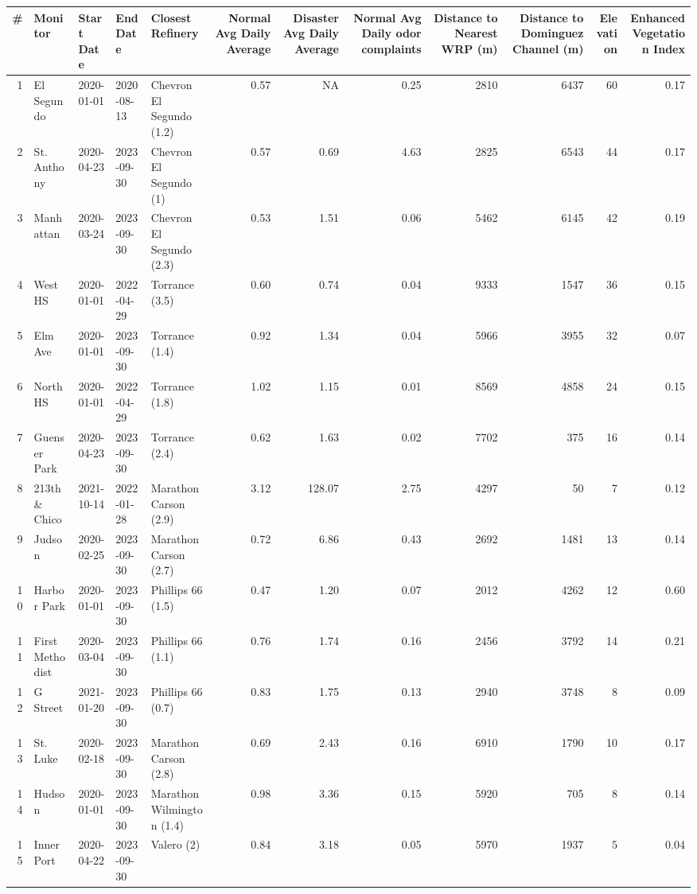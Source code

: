 
\begin{tabular}{r|l|l|l|l|r|r|r|r|r|r|r}
\hline
\# & Monitor & Start Date & End Date & Closest Refinery & Normal Avg Daily Average & Disaster Avg Daily Average & Normal Avg Daily odor complaints & Distance to Nearest WRP (m) & Distance to Dominguez Channel (m) & Elevation & Enhanced Vegetation Index\\
\hline
1 & El Segundo & 2020-01-01 & 2020-08-13 & Chevron El Segundo (1.2) & 0.57 & NA & 0.25 & 2810 & 6437 & 60 & 0.17\\
\hline
2 & St. Anthony & 2020-04-23 & 2023-09-30 & Chevron El Segundo (1) & 0.57 & 0.69 & 4.63 & 2825 & 6543 & 44 & 0.17\\
\hline
3 & Manhattan & 2020-03-24 & 2023-09-30 & Chevron El Segundo (2.3) & 0.53 & 1.51 & 0.06 & 5462 & 6145 & 42 & 0.19\\
\hline
4 & West HS & 2020-01-01 & 2022-04-29 & Torrance (3.5) & 0.60 & 0.74 & 0.04 & 9333 & 1547 & 36 & 0.15\\
\hline
5 & Elm Ave & 2020-01-01 & 2023-09-30 & Torrance (1.4) & 0.92 & 1.34 & 0.04 & 5966 & 3955 & 32 & 0.07\\
\hline
6 & North HS & 2020-01-01 & 2022-04-29 & Torrance (1.8) & 1.02 & 1.15 & 0.01 & 8569 & 4858 & 24 & 0.15\\
\hline
7 & Guenser Park & 2020-04-23 & 2023-09-30 & Torrance (2.4) & 0.62 & 1.63 & 0.02 & 7702 & 375 & 16 & 0.14\\
\hline
8 & 213th \& Chico & 2021-10-14 & 2022-01-28 & Marathon Carson (2.9) & 3.12 & 128.07 & 2.75 & 4297 & 50 & 7 & 0.12\\
\hline
9 & Judson & 2020-02-25 & 2023-09-30 & Marathon Carson (2.7) & 0.72 & 6.86 & 0.43 & 2692 & 1481 & 13 & 0.14\\
\hline
10 & Harbor Park & 2020-01-01 & 2023-09-30 & Phillips 66 (1.5) & 0.47 & 1.20 & 0.07 & 2012 & 4262 & 12 & 0.60\\
\hline
11 & First Methodist & 2020-03-04 & 2023-09-30 & Phillips 66 (1.1) & 0.76 & 1.74 & 0.16 & 2456 & 3792 & 14 & 0.21\\
\hline
12 & G Street & 2021-01-20 & 2023-09-30 & Phillips 66 (0.7) & 0.83 & 1.75 & 0.13 & 2940 & 3748 & 8 & 0.09\\
\hline
13 & St. Luke & 2020-02-18 & 2023-09-30 & Marathon Carson (2.8) & 0.69 & 2.43 & 0.16 & 6910 & 1790 & 10 & 0.17\\
\hline
14 & Hudson & 2020-01-01 & 2023-09-30 & Marathon Wilmington (1.4) & 0.98 & 3.36 & 0.15 & 5920 & 705 & 8 & 0.14\\
\hline
15 & Inner Port & 2020-04-22 & 2023-09-30 & Valero (2) & 0.84 & 3.18 & 0.05 & 5970 & 1937 & 5 & 0.04\\
\hline
\end{tabular}
